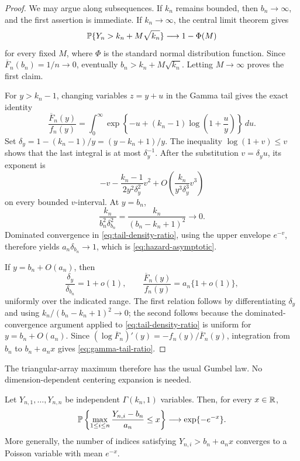 \begin{proof}
We may argue along subsequences. If \(k_n\) remains bounded, then
\(b_n\to\infty\), and the first assertion is immediate. If \(k_n\to\infty\),
the central limit theorem gives
\[
  \mathbb P\{Y_n>k_n+M\sqrt{k_n}\}\longrightarrow1-\Phi(M)
\]
for every fixed \(M\), where \(\Phi\) is the standard normal distribution
function. Since \(\overline F_n(b_n)=1/n\to0\), eventually
\(b_n>k_n+M\sqrt{k_n}\). Letting \(M\to\infty\) proves the first claim.

For \(y>k_n-1\), changing variables \(z=y+u\) in the Gamma tail gives the
exact identity
\begin{equation}
\label{eq:tail-density-ratio}
  \frac{\overline F_n(y)}{f_n(y)}
  =
  \int_0^\infty
  \exp\left\{-u+(k_n-1)\log\left(1+\frac uy\right)\right\}\,du.
\end{equation}
Set
\(\delta_y=1-(k_n-1)/y=(y-k_n+1)/y\). The inequality
\(\log(1+v)\le v\) shows that the last integral is at most
\(\delta_y^{-1}\). After the substitution \(v=\delta_yu\), its exponent is
\[
  -v-\frac{k_n-1}{2y^2\delta_y^2}v^2
  +O\left(\frac{k_n}{y^3\delta_y^3}v^3\right)
\]
on every bounded \(v\)-interval. At \(y=b_n\),
\[
  \frac{k_n}{b_n^2\delta_{b_n}^2}
  =
  \frac{k_n}{(b_n-k_n+1)^2}
  \longrightarrow0.
\]
Dominated convergence in \eqref{eq:tail-density-ratio}, using the upper
envelope \(e^{-v}\), therefore yields
\(a_n\delta_{b_n}\to1\), which is \eqref{eq:hazard-asymptotic}.

If \(y=b_n+O(a_n)\), then
\[
  \frac{\delta_y}{\delta_{b_n}}=1+o(1),
  \qquad
  \frac{\overline F_n(y)}{f_n(y)}=a_n\{1+o(1)\},
\]
uniformly over the indicated range. The first relation follows by
differentiating \(\delta_y\) and using
\(k_n/(b_n-k_n+1)^2\to0\); the second follows because the dominated-convergence
argument applied to \eqref{eq:tail-density-ratio} is uniform for
\(y=b_n+O(a_n)\). Since
\((\log\overline F_n)'(y)=-f_n(y)/\overline F_n(y)\), integration from
\(b_n\) to \(b_n+a_nx\) gives \eqref{eq:gamma-tail-ratio}.
\end{proof}

The triangular-array maximum therefore has the usual Gumbel law. No
dimension-dependent centering expansion is needed.

\begin{proposition}
\label{prop:gamma-max}
Let \(Y_{n,1},\ldots,Y_{n,n}\) be independent
\(\Gamma(k_n,1)\) variables. Then, for every \(x\in\mathbb R\),
\begin{equation}
\label{eq:gumbel-unscaled}
  \mathbb P\left\{
    \max_{1\le i\le n}\frac{Y_{n,i}-b_n}{a_n}\le x
  \right\}
  \longrightarrow
  \exp\{-e^{-x}\}.
\end{equation}
More generally, the number of indices satisfying
\(Y_{n,i}>b_n+a_nx\) converges to a Poisson variable with mean \(e^{-x}\).
\end{proposition}

